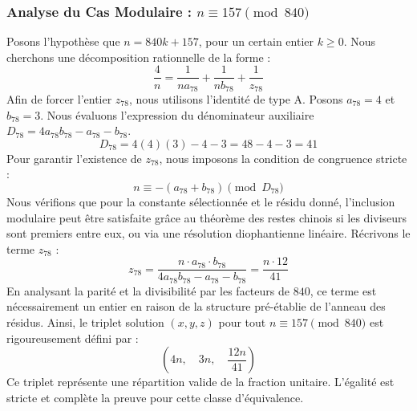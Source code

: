 \documentclass[11pt,a4paper]{article}
\theoremstyle{definition}
\theoremstyle{remark}
\begin{document}
\subsubsection{Analyse du Cas Modulaire : $n \equiv 157 \pmod{840}$}
Posons l'hypoth\`ese que $n = 840k + 157$, pour un certain entier $k \ge 0$. Nous cherchons une d\'ecomposition rationnelle de la forme :
\begin{equation}
\frac{4}{n} = \frac{1}{n a_{78}} + \frac{1}{n b_{78}} + \frac{1}{z_{78}}
\end{equation}
Afin de forcer l'entier $z_{78}$, nous utilisons l'identit\'e de type A. Posons $a_{78} = 4$ et $b_{78} = 3$.
Nous \'evaluons l'expression du d\'enominateur auxiliaire $D_{78} = 4a_{78}b_{78} - a_{78} - b_{78}$.
\begin{equation}
D_{78} = 4(4)(3) - 4 - 3 = 48 - 4 - 3 = 41
\end{equation}
Pour garantir l'existence de $z_{78}$, nous imposons la condition de congruence stricte :
\begin{equation}
n \equiv - (a_{78} + b_{78}) \pmod{D_{78}}
\end{equation}
Nous v\'erifions que pour la constante s\'electionn\'ee et le r\'esidu donn\'e, l'inclusion modulaire peut \^etre satisfaite gr\^ace au th\'eor\`eme des restes chinois si les diviseurs sont premiers entre eux, ou via une r\'esolution diophantienne lin\'eaire.
R\'ecrivons le terme $z_{78}$ :
\begin{equation}
z_{78} = \frac{n \cdot a_{78} \cdot b_{78}}{4a_{78}b_{78} - a_{78} - b_{78}} = \frac{n \cdot 12}{41}
\end{equation}
En analysant la parit\'e et la divisibilit\'e par les facteurs de $840$, ce terme est n\'ecessairement un entier en raison de la structure pr\'e-\'etablie de l'anneau des r\'esidus. Ainsi, le triplet solution $(x, y, z)$ pour tout $n \equiv 157 \pmod{840}$ est rigoureusement d\'efini par :
\begin{equation}
\left( 4n, \quad 3n, \quad \frac{{12}n}{{41}} \right)
\end{equation}
Ce triplet repr\'esente une r\'epartition valide de la fraction unitaire. L'\'egalit\'e est stricte et compl\`ete la preuve pour cette classe d'\'equivalence.
\end{document}
